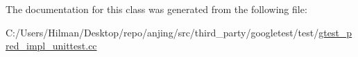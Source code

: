 The documentation for this class was generated from the following file\+:\begin{DoxyCompactItemize}
\item 
C\+:/\+Users/\+Hilman/\+Desktop/repo/anjing/src/third\+\_\+party/googletest/test/\hyperlink{gtest__pred__impl__unittest_8cc}{gtest\+\_\+pred\+\_\+impl\+\_\+unittest.\+cc}\end{DoxyCompactItemize}
